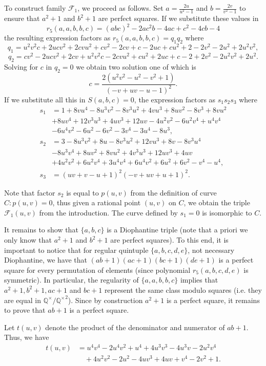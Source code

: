 \documentclass[a4paper]{amsart}
\theoremstyle{plain}
\def\Q{\mathbb{Q}}
\theoremstyle{definition}
\begin{document}
To construct family $\mathcal{F}_1$, we proceed as follows. Set $a=\frac{2u}{u^2-1}$ and $b=\frac{2v}{v^2-1}$ to ensure that $a^2+1$ and $b^2+1$ are perfect squares. If we substitute these values in $$r_5(a,a,b,b,c)=(abc)^2-2a c^2 b-4 a c+c^2-4cb-4$$ the resulting expression factors as $r_5(a,a,b,b,c)=q_1 q_2$ where
$$q_1=u^2v^2c + 2ucv^2 + 2cvu^2 + cv^2 - 2cv + c - 2uc + cu^2 + 2 - 2v^2 - 2u^2 + 2u^2v^2,$$
$$q_2=cv^2 - 2ucv^2 + 2cv + u^2v^2c - 2cvu^2 + cu^2 + 2uc + c - 2 + 2v^2 - 2u^2v^2 + 2u^2.$$
Solving for $c$ in $q_2=0$ we obtain two solution one of which is
$$c=\frac{2(u^2v^2 - u^2 - v^2 + 1)}{(-v + uv - u - 1)^2}.$$ If we substitute all this in $S(a,b,c)=0$, the expression factors as $s_1s_2s_3$ where
\begin{align*}
	s_1&=1 + 8vu^4 - 8u^3v^2 - 8v^3u^2 + 4vu^3 + 8uv^2 - 8v^3 + 8vu^2 \\
	&+ 8uv^4 + 12v^3u^3 + 4uv^3 + 12uv - 4u^2v^2 - 6u^2v^4 + u^4v^4 \\
	&- 6u^4v^2 - 6u^2 - 6v^2 - 3v^4 - 3u^4 - 8u^3,\\
	s_2&=3 - 8u^3v^2 + 8u - 8v^3u^2 + 12vu^3 + 8v - 8v^3u^4 \\
	&- 8u^3v^4 + 8uv^2 + 8vu^2 + 4v^3u^3 + 12uv^3 + 4uv \\
	&+ 4u^2v^2 + 6u^2v^4 + 3u^4v^4 + 6u^4v^2 + 6u^2 + 6v^2 - v^4 - u^4,\\
    s_3&=(uv + v - u + 1)^2 (-v + uv + u + 1)^2.
\end{align*}

Note that factor $s_2$ is equal to $p(u,v)$ from the definition of curve $C: p(u,v)=0$, thus given a rational point $(u,v)$ on $C$,
we obtain the triple $\mathcal{F}_1(u,v)$ from the introduction. The curve defined by $s_1=0$ is isomorphic to $C$.

It remains to show that $\{a,b,c\}$ is a Diophantine triple (note that a priori we
only know that $a^2+1$ and $b^2+1$ are perfect squares). To this end, it is important to notice that for regular quintuple $\{a,b,c,d,e\}$, not necessary Diophantine,
we have that $(ab+1)(ac+1)(bc+1)(de+1)$ is a perfect square for every permutation of elements (since polynomial $r_5(a,b,c,d,e)$ is symmetric). In particular, the regularity of $\{a,a,b,b,c\}$ implies that $a^2+1, b^2+1, ac+1$ and $bc+1$ represent the same class modulo squares (i.e. they are equal in $\Q^\times/{\Q^\times}^2$).
Since by construction $a^2+1$ is a perfect square, it remains to prove that $ab+1$  is a perfect square.


Let $t(u,v)$ denote the product of the denominator and numerator of $ab+1$. Thus, we have
\[
\begin{aligned}
	t(u,v) &= u^4v^4 - 2u^4v^2 + u^4 + 4u^3v^3 - 4u^3v - 2u^2v^4 \\
	&\quad+ 4u^2v^2 - 2u^2 - 4uv^3 + 4uv + v^4 - 2v^2 + 1.
\end{aligned}
\]
\end{document}
